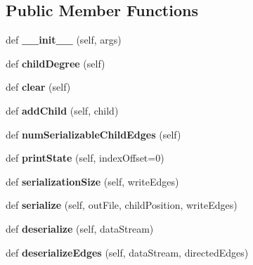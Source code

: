 \subsection*{Public Member Functions}
\begin{DoxyCompactItemize}
\item 
\mbox{\label{classinfomap_1_1SNode_aea2d638ad3006d36b9ca4bd2484558d1}} 
def {\bfseries \+\_\+\+\_\+init\+\_\+\+\_\+} (self, args)
\item 
\mbox{\label{classinfomap_1_1SNode_a80d19e80ab8e20c1ddd18cb5a9853034}} 
def {\bfseries child\+Degree} (self)
\item 
\mbox{\label{classinfomap_1_1SNode_aa0c82dd94a6035ab60065629a985db27}} 
def {\bfseries clear} (self)
\item 
\mbox{\label{classinfomap_1_1SNode_a04ef93c12bbad66d5bba24bd495286f4}} 
def {\bfseries add\+Child} (self, child)
\item 
\mbox{\label{classinfomap_1_1SNode_ac6807ce32f46529bf6d2b009b70c497b}} 
def {\bfseries num\+Serializable\+Child\+Edges} (self)
\item 
\mbox{\label{classinfomap_1_1SNode_af415c2a64ec0890f2bab1d92ad09ac9d}} 
def {\bfseries print\+State} (self, index\+Offset=0)
\item 
\mbox{\label{classinfomap_1_1SNode_aa5c99f22eca53c8aa54613ff8fedaa4a}} 
def {\bfseries serialization\+Size} (self, write\+Edges)
\item 
\mbox{\label{classinfomap_1_1SNode_a973138124392a9b81edceadca6260fb3}} 
def {\bfseries serialize} (self, out\+File, child\+Position, write\+Edges)
\item 
\mbox{\label{classinfomap_1_1SNode_ab05250cdcc9bb10423a5c0119774d26b}} 
def {\bfseries deserialize} (self, data\+Stream)
\item 
\mbox{\label{classinfomap_1_1SNode_af322888b0d9e75eedbaab9b190294e21}} 
def {\bfseries deserialize\+Edges} (self, data\+Stream, directed\+Edges)

\end{DoxyCompactItemize}
